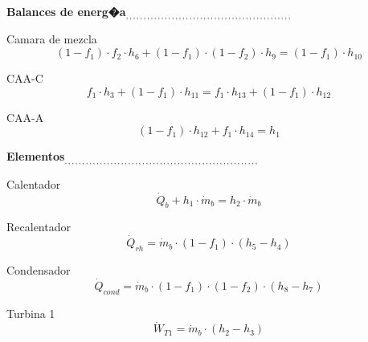 \documentclass[10pt,fleqn]{article}
\theoremstyle{mytheoremstyle}
\theoremstyle{mytheoremstyle}
\theoremstyle{myproblemstyle}
\begin{document}
\vspace{0.10in}
\noindent
{\color{red} \bf Balances de energ�a$_{,,,,,,,,,,,,,,,,,,,,,,,,,,,,,,,,,,,,,,,,,,,,,,,}$}

\vspace{0.10in}
\noindent
{\color{blue} \rm Camara de mezcla}
\begin{equation}
\label{EES Eqn:72}
\left( 1-f_{1} \right) \cdot f_{2}\cdot h_{6}+ \left( 1-f_{1} \right) \cdot  \left( 1-f_{2} \right) \cdot h_{9}= \left( 1-f_{1} \right) \cdot h_{10} 
\end{equation}

\vspace{0.10in}
\noindent
{\color{blue} \rm CAA-C}
\begin{equation}
\label{EES Eqn:73}
f_{1}\cdot h_{3}+ \left( 1-f_{1} \right) \cdot h_{11}=f_{1}\cdot h_{13}+ \left( 1-f_{1} \right) \cdot h_{12} 
\end{equation}

\vspace{0.10in}
\noindent
{\color{blue} \rm CAA-A}
\begin{equation}
\label{EES Eqn:74}
\left( 1-f_{1} \right) \cdot h_{12}+f_{1}\cdot h_{14}=h_{1} 
\end{equation}

\vspace{0.10in}
\noindent
{\color{red} \bf Elementos$_{,,,,,,,,,,,,,,,,,,,,,,,,,,,,,,,,,,,,,,,,,,,,,,,,,,,,,,,}$}

\vspace{0.10in}
\noindent
{\color{blue} \rm Calentador}
\begin{equation}
\label{EES Eqn:75}
\dot {Q}_{b}+h_{1}\cdot \dot {m}_{b}=h_{2}\cdot \dot {m}_{b} 
\end{equation}

\vspace{0.10in}
\noindent
{\color{blue} \rm Recalentador}
\begin{equation}
\label{EES Eqn:76}
\dot {Q}_{rh}=\dot {m}_{b}\cdot  \left( 1-f_{1} \right) \cdot  \left( h_{5}-h_{4} \right)  
\end{equation}

\vspace{0.10in}
\noindent
{\color{blue} \rm Condensador}
\begin{equation}
\label{EES Eqn:77}
\dot {Q}_{cond}=\dot {m}_{b}\cdot  \left( 1-f_{1} \right) \cdot  \left( 1-f_{2} \right) \cdot  \left( h_{8}-h_{7} \right)  
\end{equation}

\vspace{0.10in}
\noindent
{\color{blue} \rm Turbina 1}
\begin{equation}
\label{EES Eqn:78}
\dot {W}_{T1}=\dot {m}_{b}\cdot  \left( h_{2}-h_{3} \right)  
\end{equation}
\end{document}
